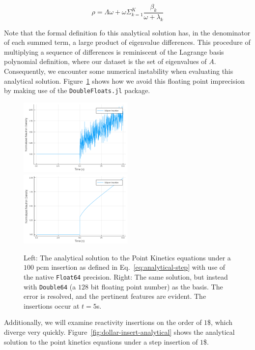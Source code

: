 \documentclass[review,onefignum,onetabnum]{siamart171218}
\begin{document}
\begin{equation}
  \rho = \Lambda\omega + \omega \Sigma_{k=1}^K \frac{\beta_k}{\omega + \lambda_k}
\end{equation}

Note that the formal definition fo this analytical solution has, in the denominator
of each summed term, a large product of eigenvalue differences. This procedure of
multiplying a sequence of differences is reminiscent of the Lagrange basis polynomial
definition, where our dataset is the set of eigenvalues of $A$. Consequently,
we encounter some numerical instability when evaluating this analytical solution.
Figure~\cref{fig:single-double-prec} shows how we avoid this floating point
imprecision by making use of the \texttt{DoubleFloats.jl} package.\\

\begin{figure}[htb]
  \includegraphics[width=0.5\textwidth]{../plots/analytical-sols/100pcm_fp_error.png}
  \includegraphics[width=0.5\textwidth]{../plots/analytical-sols/100pcm.png}
  \caption{Left: The analytical solution to the Point Kinetics equations under a $100$ pcm insertion
  as defined in Eq.~\cref{eq:analytical-step} with use of the native \texttt{Float64} precision.
  Right: The same solution, but instead with \texttt{Double64} (a $128$ bit floating point number)
  as the basis. The error is resolved, and the pertinent features are evident. The insertions occur
  at $t = 5$s.}
  \label{fig:single-double-prec}
\end{figure}

Additionally, we will examine reactivity insertions on the order of $1$\$, which
diverge very quickly. Figure~\cref{fig:dollar-insert-analytical} shows the analytical
solution to the point kinetics equations under a step insertion of $1$\$.
\end{document}
